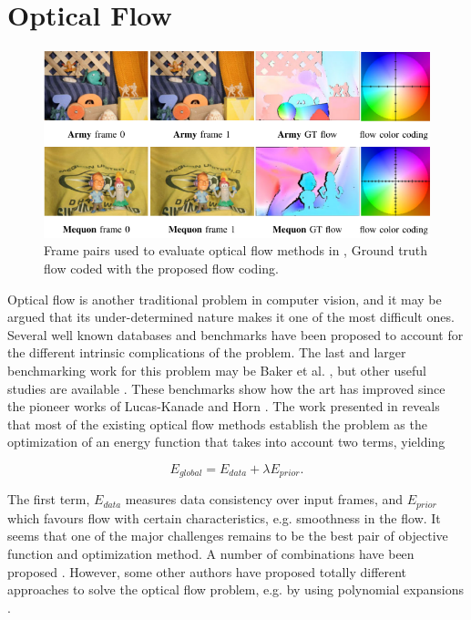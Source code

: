 \section{Optical Flow}

   \begin{figure}[thpb]
      \centering
      \includegraphics[width=1.0\textwidth]{../images/of_db.png}
      \caption{Frame pairs used to evaluate optical flow methods in \cite{c17}, Ground truth flow coded with the proposed flow coding. }
      \label{tr_db}
   \end{figure}

Optical flow is another traditional problem in computer vision, and it may be argued that its under-determined nature makes it one of the most difficult ones. 
Several well known databases and benchmarks have been proposed to account for the different intrinsic complications of the problem. The last and larger benchmarking 
work for this problem may be Baker et al. \cite{c17}, but other useful studies are available \cite{c27}. These benchmarks show how the art has improved since the pioneer 
works of Lucas-Kanade \cite{c31} and Horn \cite{c5}.
The work presented in \cite{c17} reveals that most of the existing optical flow methods establish the problem as the optimization of an energy function that takes into account two terms, yielding

\begin{equation}
E_{global} = E_{data} + \lambda E_{prior}.
\label{eq_ener}
\end{equation}

 The first term, $E_{data}$ 
measures data consistency over input frames, and $E_{prior}$ which favours flow with certain characteristics, e.g. smoothness in the flow. It seems that one of the major 
challenges remains to be the best pair of objective function and optimization method. A number of combinations have been proposed \cite{c29}\cite{c30}\cite{c32}. However, 
some other authors have proposed totally different approaches to solve the optical flow problem, e.g. by using polynomial expansions \cite{c28}.

